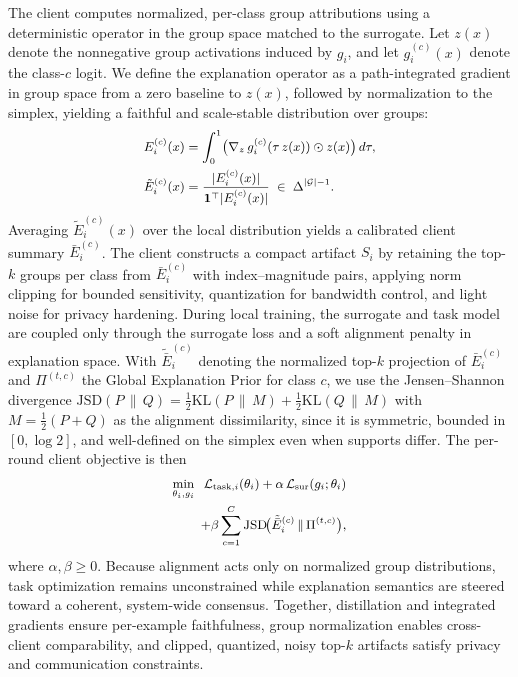 \documentclass{article}
\theoremstyle{plain}
\theoremstyle{definition}
\theoremstyle{remark}
\begin{document}
The client computes normalized, per-class group attributions using a deterministic operator in the group space matched to the surrogate. Let $z(x)$ denote the nonnegative group activations induced by $g_i$, and let $g_i^{(c)}(x)$ denote the class-$c$ logit. We define the explanation operator as a path-integrated gradient in group space from a zero baseline to $z(x)$, followed by normalization to the simplex, yielding a faithful and scale-stable distribution over groups:
\begin{equation}
\label{eq:expl-iclr}
{\small
\begin{aligned}
E_i^{(c)}(x)
&=\int_{0}^{1}\!\big(\nabla_{z}\,g_i^{(c)}(\tau\,z(x))\odot z(x)\big)\,d\tau, \\
\tilde{E}_i^{(c)}(x)
&=\frac{\lvert E_i^{(c)}(x)\rvert}{\mathbf{1}^\top\lvert E_i^{(c)}(x)\rvert}
\;\in\;\Delta^{|\mathcal{G}|-1}.
\end{aligned}
}
\end{equation}
Averaging $\tilde{E}_i^{(c)}(x)$ over the local distribution yields a calibrated client summary $\bar{E}_i^{(c)}$. The client constructs a compact artifact $S_i$ by retaining the top-$k$ groups per class from $\bar{E}_i^{(c)}$ with index--magnitude pairs, applying norm clipping for bounded sensitivity, quantization for bandwidth control, and light noise for privacy hardening. During local training, the surrogate and task model are coupled only through the surrogate loss and a soft alignment penalty in explanation space. With $\tilde{\bar{E}}_i^{(c)}$ denoting the normalized top-$k$ projection of $\bar{E}_i^{(c)}$ and $\Pi^{(t,c)}$ the Global Explanation Prior for class $c$, we use the Jensen--Shannon divergence
$\mathrm{JSD}(P\,\|\,Q) = \tfrac{1}{2}\mathrm{KL}(P\,\|\,M) + \tfrac{1}{2}\mathrm{KL}(Q\,\|\,M)$ with $M = \tfrac{1}{2}(P+Q)$
as the alignment dissimilarity, since it is symmetric, bounded in $[0,\log 2]$, and well-defined on the simplex even when supports differ. The per-round client objective is then
\begin{equation}
\label{eq:local-iclr}
{\small
\begin{aligned}
\min_{\theta_i,g_i}\;\;
\mathcal{L}_{\mathrm{task},i}(\theta_i)
+\alpha\,\mathcal{L}_{\mathrm{sur}}(g_i;\theta_i) \\
+\beta\sum_{c=1}^{C}\mathrm{JSD}\!\big(\tilde{\bar{E}}_i^{(c)}\,\|\,\Pi^{(t,c)}\big),
\end{aligned}
}
\end{equation}
where $\alpha,\beta\ge 0$. Because alignment acts only on normalized group distributions, task optimization remains unconstrained while explanation semantics are steered toward a coherent, system-wide consensus. Together, distillation and integrated gradients ensure per-example faithfulness, group normalization enables cross-client comparability, and clipped, quantized, noisy top-$k$ artifacts satisfy privacy and communication constraints.
\end{document}
